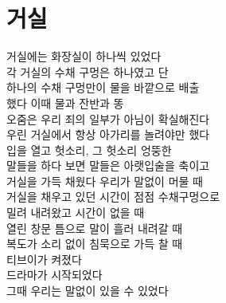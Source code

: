\hypertarget{uxac70uxc2e4}{%

\chapter{거실}\label{uxac70uxc2e4}}



거실에는 화장실이 하나씩 있었다\\

각 거실의 수채 구멍은 하나였고 단\\

하나의 수채 구멍만이 물을 바깥으로 배출\\

했다 이때 물과 잔반과 똥\\

오줌은 우리 죄의 일부가 아님이 확실해진다\\

우린 거실에서 항상 아가리를 놀려야만 했다\\

입을 열고 헛소리, 그 헛소리 엉뚱한\\

말들을 하다 보면 말들은 아랫입술을 축이고\\

거실을 가득 채웠다 우리가 말없이 머물 때\\

거실을 채우고 있던 시간이 점점 수채구멍으로\\

밀려 내려왔고 시간이 없을 때\\

열린 창문 틈으로 말이 흘러 내려갈 때\\

복도가 소리 없이 침묵으로 가득 찰 때\\

티브이가 켜졌다\\

드라마가 시작되었다\\

그때 우리는 말없이 있을 수 있었다

